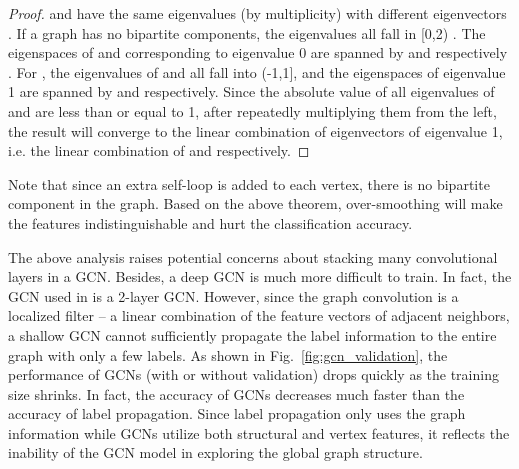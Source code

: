 \documentclass[letterpaper]{article} \usepackage{aaai18}  \usepackage{times}  \usepackage{helvet}  \usepackage{courier}  \usepackage{url}  \usepackage{graphicx}  \usepackage{algorithm}
\begin{document}
\begin{proof}
     and  have the same  eigenvalues (by multiplicity) with different eigenvectors \cite{von2007tutorial}. If a graph has no bipartite components, the eigenvalues all fall in [0,2) \cite{Chung97}. The eigenspaces of  and  corresponding to eigenvalue 0 are spanned by  and 
    respectively \cite{von2007tutorial}. For , the eigenvalues of  and  all fall into (-1,1], and the eigenspaces of eigenvalue 1 are spanned by  and  respectively.
    Since the absolute value of all eigenvalues of  and  are less than or equal to 1, after repeatedly multiplying them from the left, the result will converge to the linear combination of eigenvectors of eigenvalue 1, i.e. the linear combination of  and  respectively.
\end{proof}
Note that since an extra self-loop is added to each vertex, there is no bipartite component in the graph. Based on the above theorem, over-smoothing will make the features indistinguishable and hurt the classification accuracy.



The above analysis raises potential concerns about stacking many convolutional layers in a GCN. Besides, a deep GCN is much more difficult to train. In fact, the GCN used in \cite{kipf2016semi} is a 2-layer GCN. However, since the graph convolution is a localized filter -- a linear combination of the feature vectors of adjacent neighbors, a shallow GCN cannot sufficiently propagate the label information to the entire graph with only a few labels. As shown in Fig.~\ref{fig:gcn_validation}, the performance of GCNs (with or without validation) drops quickly as the training size shrinks. In fact, the accuracy of GCNs decreases much faster than the accuracy of label propagation. Since label propagation only uses the graph information while GCNs utilize both structural and vertex features, it reflects the inability of the GCN model in exploring the global graph structure.
\end{document}
